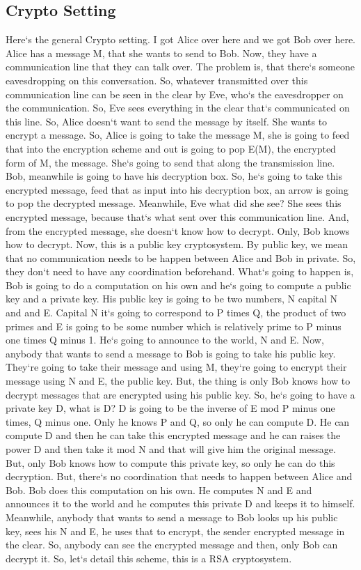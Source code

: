 \subsection{Crypto Setting}
Here`s the general Crypto setting.
I got Alice over here and we got Bob over here.
Alice has a message M, that she wants to send to Bob.
Now, they have a communication line that they can talk over.
The problem is, that there`s someone eavesdropping on this conversation.
So, whatever transmitted over this communication line can be seen in the clear by Eve, who`s the eavesdropper on the communication.
So, Eve sees everything in the clear that`s communicated on this line.
So, Alice doesn`t want to send the message by itself.
She wants to encrypt a message.
So, Alice is going to take the message M, she is going to feed that into the encryption scheme and out is going to pop E(M), the encrypted form of M, the message.
She`s going to send that along the transmission line.
Bob, meanwhile is going to have his decryption box.
So, he`s going to take this encrypted message, feed that as input into his decryption box, an arrow is going to pop the decrypted message.
Meanwhile, Eve what did she see? She sees this encrypted message, because that`s what sent over this communication line.
And, from the encrypted message, she doesn`t know how to decrypt.
Only, Bob knows how to decrypt.
Now, this is a public key cryptosystem.
By public key, we mean that no communication needs to be happen between Alice and Bob in private.
So, they don`t need to have any coordination beforehand.
What`s going to happen is, Bob is going to do a computation on his own and he`s going to compute a public key and a private key.
His public key is going to be two numbers, N capital N and and E\@.
Capital N it`s going to correspond to P times Q, the product of two primes and E is going to be some number which is relatively prime to P minus one times Q minus 1.
He`s going to announce to the world, N and E\@.
Now, anybody that wants to send a message to Bob is going to take his public key.
They`re going to take their message and using M, they`re going to encrypt their message using N and E, the public key.
But, the thing is only Bob knows how to decrypt messages that are encrypted using his public key.
So, he`s going to have a private key D, what is D? D is going to be the inverse of E mod P minus one times, Q minus one.
Only he knows P and Q, so only he can compute D\@.
He can compute D and then he can take this encrypted message and he can raises the power D and then take it mod N and that will give him the original message.
But, only Bob knows how to compute this private key, so only he can do this decryption.
But, there`s no coordination that needs to happen between Alice and Bob.
Bob does this computation on his own.
He computes N and E and announces it to the world and he computes this private D and keeps it to himself.
Meanwhile, anybody that wants to send a message to Bob looks up his public key, sees his N and E, he uses that to encrypt, the sender encrypted message in the clear.
So, anybody can see the encrypted message and then, only Bob can decrypt it.
So, let`s detail this scheme, this is a RSA cryptosystem.

